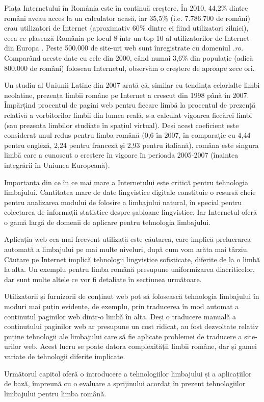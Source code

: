 \documentclass[]{../../metanetpaper}
\begin{document}
\begin{multicols}{2}
Piața Internetului în România este în continuă creștere. În 2010, 44,2\% dintre români aveau acces la un calculator acasă, iar 35,5\% (i.e. 7.786.700 de români) erau utilizatori de Internet \cite{urlInternetStatsRO} (aproximativ 60\% dintre ei fiind utilizatori zilnici), ceea ce plasează România pe locul 8 într-un top 10 al utilizatorilor de Internet din Europa \cite{urlInternetStatsEU}. Peste 500.000 de site-uri web sunt înregistrate cu domeniul \textit{.ro}. Comparând aceste date cu cele din 2000, când numai 3,6\% din populație (adică 800.000 de români) foloseau Internetul, observăm o creștere de aproape zece ori.

Un studiu al Uniunii Latine din 2007 \cite{uniunealat} arată că, similar cu tendința celorlalte limbi neolatine, prezența limbii române pe Internet a crescut din 1998 până în 2007. Împărțind procentul de pagini web pentru fiecare limbă la procentul de prezență relativă a vorbitorilor limbii din lumea reală, s-a calculat vigoarea fiecărei limbi (sau prezența limbilor studiate în spațiul virtual). Deși acest coeficient este considerat unul redus pentru limba română (0,6 în 2007, în comparație cu 4,44 pentru engleză, 2,24 pentru franceză și 2,93 pentru italiană), româna este singura limbă care a cunoscut o creștere în vigoare în perioada 2005-2007 (înaintea integrării în Uniunea Europeană).


Importanța din ce în ce mai mare a Internetului este critică pentru tehnologia limbajului. Cantitatea mare de date lingvistice digitale constituie o resursă cheie pentru analizarea modului de folosire a limbajului natural, în special pentru colectarea de informații statistice despre șabloane lingvistice. Iar Internetul oferă o gamă largă de domenii de aplicare pentru tehnologia limbajului.

Aplicația web cea mai frecvent utilizată este căutarea, care implică prelucrarea automată a limbajului pe mai multe niveluri, după cum vom arăta mai târziu. Căutare pe Internet implică tehnologii lingvistice sofisticate, diferite de la o limbă la alta. Un exemplu pentru limba română presupune uniformizarea diacriticelor, dar sunt multe altele ce vor fi detaliate în secțiunea următoare.

Utilizatorii și furnizorii de conținut web pot să folosească tehnologia limbajului în moduri mai puțin evidente, de exemplu, prin traducerea în mod automat a conținutul paginilor web dintr-o limbă în alta. Deși o traducere manuală a conținutului paginilor web ar presupune un cost ridicat, au fost dezvoltate relativ puține tehnologii ale limbajului care să fie aplicate problemei de traducere a site-urilor web. Acest lucru se poate datora complexității limbii române, dar și gamei variate de tehnologii diferite implicate.

Următorul capitol oferă o introducere a tehnologiilor limbajului și a aplicațiilor de bază, împreună cu o evaluare a sprijinului acordat în prezent tehnologiilor limbajului pentru limba română.

\end{multicols}
\end{document}

